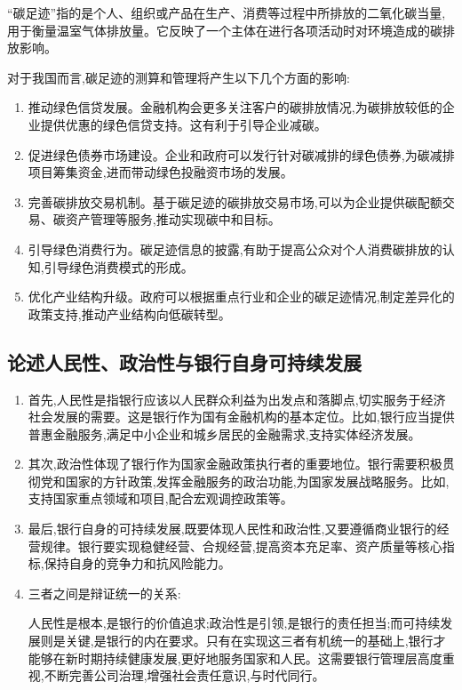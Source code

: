 \documentclass{article}
\begin{document}
``碳足迹''指的是个人、组织或产品在生产、消费等过程中所排放的二氧化碳当量,用于衡量温室气体排放量。它反映了一个主体在进行各项活动时对环境造成的碳排放影响。
  
对于我国而言,碳足迹的测算和管理将产生以下几个方面的影响:
\begin{enumerate}
	\item 推动绿色信贷发展。金融机构会更多关注客户的碳排放情况,为碳排放较低的企业提供优惠的绿色信贷支持。这有利于引导企业减碳。
	\item 促进绿色债券市场建设。企业和政府可以发行针对碳减排的绿色债券,为碳减排项目筹集资金,进而带动绿色投融资市场的发展。
	\item 完善碳排放交易机制。基于碳足迹的碳排放交易市场,可以为企业提供碳配额交易、碳资产管理等服务,推动实现碳中和目标。
	\item 引导绿色消费行为。碳足迹信息的披露,有助于提高公众对个人消费碳排放的认知,引导绿色消费模式的形成。
	\item 优化产业结构升级。政府可以根据重点行业和企业的碳足迹情况,制定差异化的政策支持,推动产业结构向低碳转型。
\end{enumerate}

\subsection{论述人民性、政治性与银行自身可持续发展}

\begin{enumerate}
	\item 首先,人民性是指银行应该以人民群众利益为出发点和落脚点,切实服务于经济社会发展的需要。这是银行作为国有金融机构的基本定位。比如,银行应当提供普惠金融服务,满足中小企业和城乡居民的金融需求,支持实体经济发展。
	\item 其次,政治性体现了银行作为国家金融政策执行者的重要地位。银行需要积极贯彻党和国家的方针政策,发挥金融服务的政治功能,为国家发展战略服务。比如,支持国家重点领域和项目,配合宏观调控政策等。
	\item 最后,银行自身的可持续发展,既要体现人民性和政治性,又要遵循商业银行的经营规律。银行要实现稳健经营、合规经营,提高资本充足率、资产质量等核心指标,保持自身的竞争力和抗风险能力。
	\item 三者之间是辩证统一的关系:

	人民性是根本,是银行的价值追求;政治性是引领,是银行的责任担当;而可持续发展则是关键,是银行的内在要求。只有在实现这三者有机统一的基础上,银行才能够在新时期持续健康发展,更好地服务国家和人民。这需要银行管理层高度重视,不断完善公司治理,增强社会责任意识,与时代同行。
\end{enumerate}
\end{document}
